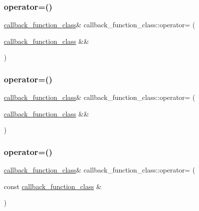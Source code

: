 \subsubsection{\texorpdfstring{operator=()}{operator=()}\hspace{0.1cm}{\footnotesize\ttfamily [1/4]}}
{\footnotesize\ttfamily \mbox{\hyperlink{classcallback__function__class}{callback\+\_\+function\+\_\+class}}\& callback\+\_\+function\+\_\+class\+::operator= (\begin{DoxyParamCaption}\item[{\mbox{\hyperlink{classcallback__function__class}{callback\+\_\+function\+\_\+class}} \&\&}]{ }\end{DoxyParamCaption})\hspace{0.3cm}{\ttfamily [delete]}}

\mbox{\label{classcallback__function__class_add0667bafa4b40d9726fe353f02a969a}} 
\subsubsection{\texorpdfstring{operator=()}{operator=()}\hspace{0.1cm}{\footnotesize\ttfamily [2/4]}}
{\footnotesize\ttfamily \mbox{\hyperlink{classcallback__function__class}{callback\+\_\+function\+\_\+class}}\& callback\+\_\+function\+\_\+class\+::operator= (\begin{DoxyParamCaption}\item[{\mbox{\hyperlink{classcallback__function__class}{callback\+\_\+function\+\_\+class}} \&\&}]{ }\end{DoxyParamCaption})\hspace{0.3cm}{\ttfamily [delete]}}

\mbox{\label{classcallback__function__class_abe53fd6cc7a9a772b725144dc3deaa4b}} 
\subsubsection{\texorpdfstring{operator=()}{operator=()}\hspace{0.1cm}{\footnotesize\ttfamily [3/4]}}
{\footnotesize\ttfamily \mbox{\hyperlink{classcallback__function__class}{callback\+\_\+function\+\_\+class}}\& callback\+\_\+function\+\_\+class\+::operator= (\begin{DoxyParamCaption}\item[{const \mbox{\hyperlink{classcallback__function__class}{callback\+\_\+function\+\_\+class}} \&}]{ }\end{DoxyParamCaption})\hspace{0.3cm}{\ttfamily [delete]}}

